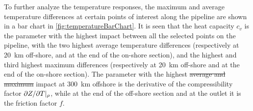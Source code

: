 
To further analyze the temperature responses, the maximum and average temperature differences at certain points of interest along the pipeline are shown in a bar chart in \cref{fig:temperatureBarChart}. %
It is seen that the heat capacity $c_v$ is the parameter with the highest impact between all the selected points on the pipeline, with the two highest average temperature differences (respectively at \SI{20}{\kilo\meter} off-shore, and at the end of the on-shore section), and the highest and third highest maximum differences (respectively at \SI{20}{\kilo\meter} off-shore and at the end of the on-shore section). The parameter with the highest \st{average and maximum} impact at \SI{300}{\kilo\meter} offshore is the derivative of the compressibility factor $\partial Z/\partial T\/|_\rho$, while at the end of the off-shore section and at the outlet it is the friction factor $f$.



